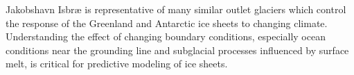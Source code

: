 Jakobshavn Isbr{\ae} is representative of many similar outlet glaciers which control the response of the Greenland and Antarctic ice sheets to changing climate.
Understanding the effect of changing boundary conditions, especially ocean conditions near the grounding line and subglacial processes influenced by surface melt, is critical for predictive modeling of ice sheets.
